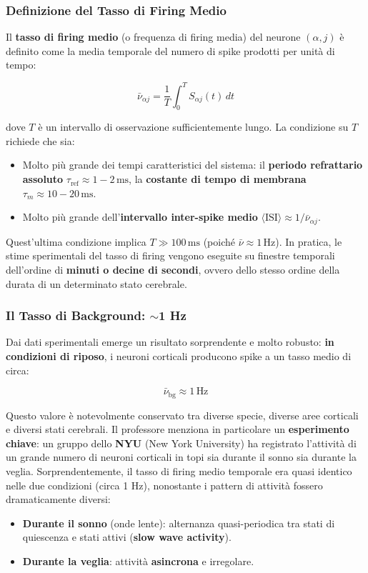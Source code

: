 \subsubsection{Definizione del Tasso di Firing Medio}

Il \textbf{tasso di firing medio} (o frequenza di firing media) del neurone $(\alpha, j)$ è definito come la media temporale del numero di spike prodotti per unità di tempo:

\begin{equation}
\bar{\nu}_{\alpha j} = \frac{1}{T} \int_0^T S_{\alpha j}(t)\, dt
\end{equation}

dove $T$ è un intervallo di osservazione sufficientemente lungo. La condizione su $T$ richiede che sia:
\begin{itemize}
    \item Molto più grande dei tempi caratteristici del sistema: il \textbf{periodo refrattario assoluto} $\tau_{\text{ref}} \approx 1-2\,\text{ms}$, la \textbf{costante di tempo di membrana} $\tau_m \approx 10-20\,\text{ms}$.
    \item Molto più grande dell'\textbf{intervallo inter-spike medio} $\langle \text{ISI} \rangle \approx 1/\bar{\nu}_{\alpha j}$.
\end{itemize}

Quest'ultima condizione implica $T \gg 100\,\text{ms}$ (poiché $\bar{\nu} \approx 1\,\text{Hz}$). In pratica, le stime sperimentali del tasso di firing vengono eseguite su finestre temporali dell'ordine di \textbf{minuti o decine di secondi}, ovvero dello stesso ordine della durata di un determinato stato cerebrale.

\subsubsection{Il Tasso di Background: $\sim$1 Hz}

Dai dati sperimentali emerge un risultato sorprendente e molto robusto: \textbf{in condizioni di riposo}, i neuroni corticali producono spike a un tasso medio di circa:

\begin{equation}
\bar{\nu}_{\text{bg}} \approx 1\,\text{Hz}
\end{equation}

Questo valore è notevolmente conservato tra diverse specie, diverse aree corticali e diversi stati cerebrali. Il professore menziona in particolare un \textbf{esperimento chiave}: un gruppo dello \textbf{NYU} (New York University) ha registrato l'attività di un grande numero di neuroni corticali in topi sia durante il sonno sia durante la veglia. Sorprendentemente, il tasso di firing medio temporale era quasi identico nelle due condizioni (circa 1 Hz), nonostante i pattern di attività fossero dramaticamente diversi:
\begin{itemize}
    \item \textbf{Durante il sonno} (onde lente): alternanza quasi-periodica tra stati di quiescenza e stati attivi (\textbf{slow wave activity}).
    \item \textbf{Durante la veglia}: attività \textbf{asincrona} e irregolare.
\end{itemize}

